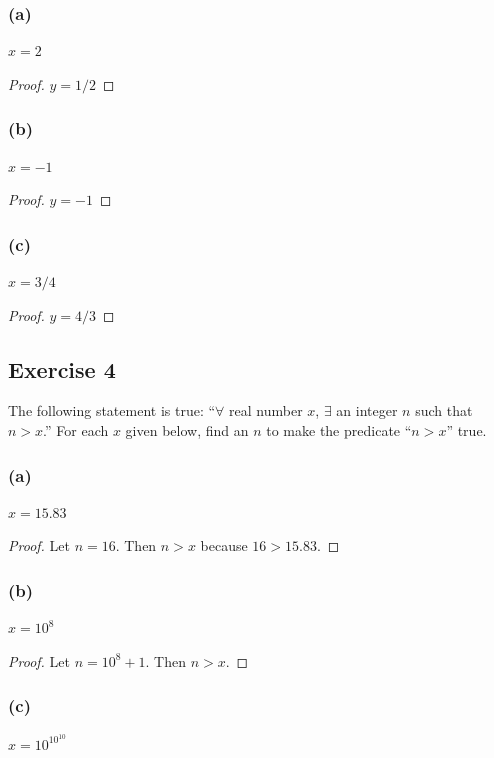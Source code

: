 \documentclass[14pt]{extarticle}
\newcommand{\fa}{\forall}
\newcommand{\te}{\exists}
\begin{document}
\subsubsection{(a)}
$x = 2$

\begin{proof}
$y = 1/2$
\end{proof}

\subsubsection{(b)}
$x = -1$

\begin{proof}
$y = -1$
\end{proof}

\subsubsection{(c)}
$x = 3/4$

\begin{proof}
$y = 4/3$
\end{proof}

\subsection{Exercise 4}
The following statement is true: “$\fa$ real number $x$, $\te$ an integer $n$ such that $n > x$.” For each $x$ given below, find an $n$ to make the predicate “$n > x$” true.

\subsubsection{(a)}
$x = 15.83$

\begin{proof}
Let $n = 16$. Then $n > x$ because $16 > 15.83$.
\end{proof}

\subsubsection{(b)}
$x = 10^8$

\begin{proof}
Let $n = 10^8 + 1$. Then $n > x$.
\end{proof}

\subsubsection{(c)}
$x = 10^{10^{10}}$
\end{document}
